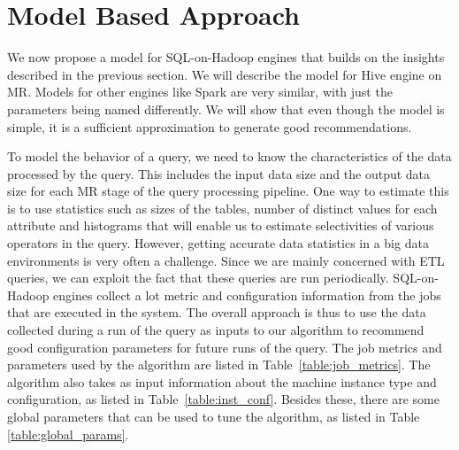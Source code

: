 \section{Model Based Approach}
\label{sec:modelbased}
We now propose a model for SQL-on-Hadoop engines that builds on the insights described in the previous section. We will describe the model for Hive engine on MR. Models for other engines like Spark are very similar, with just the parameters being named differently.  We will show that even though the model is simple, it is a sufficient approximation to generate good recommendations. 

To model the behavior of a query, we need to know the characteristics of the data processed by the query. This includes the input data size and the output data size for each MR stage of the query processing pipeline. One way to estimate this is to use statistics such as sizes of the tables, number of distinct values for each attribute and histograms that will enable us to estimate selectivities of various operators in the query. However, getting accurate data statistics in a big data environments is very often a challenge. Since we are mainly concerned with ETL queries, we can exploit the fact that these queries are run periodically. SQL-on-Hadoop engines collect a lot metric and configuration information from the jobs that are executed in the system. The overall approach is thus to use the data collected during a run of the query as inputs to our algorithm to recommend good configuration parameters for future runs of the query. The job metrics and parameters used by the algorithm are listed in Table~\ref{table:job_metrics}. The algorithm also takes as input information about the machine instance type and configuration, as listed in Table~\ref{table:inst_conf}. Besides these, there are some global parameters that can be used to tune the algorithm, as listed in Table \ref{table:global_params}.


